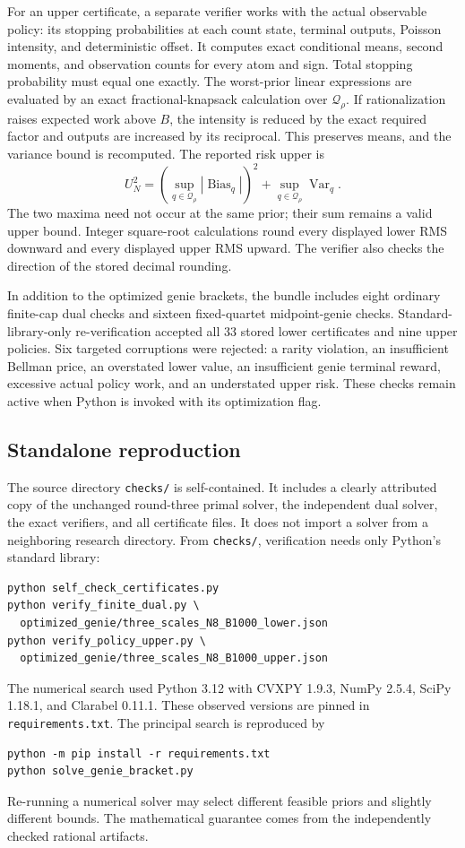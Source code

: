 For an upper certificate, a separate verifier works with the actual
observable policy: its stopping probabilities at each count state,
terminal outputs, Poisson intensity, and deterministic offset. It
computes exact conditional means, second moments, and observation
counts for every atom and sign. Total stopping probability must equal
one exactly. The worst-prior linear expressions are evaluated by an
exact fractional-knapsack calculation over $\mathcal Q_\rho$.
If rationalization raises expected work above $B$, the intensity is
reduced by the exact required factor and outputs are increased by its
reciprocal. This preserves means, and the variance bound is recomputed.
The reported risk upper is
\[
 U_N^2=
 \left(\sup_{q\in\mathcal Q_\rho}
                  |\operatorname{Bias}_q|\right)^2+
 \sup_{q\in\mathcal Q_\rho}\operatorname{Var}_q.
\]
The two maxima need not occur at the same prior; their sum remains a
valid upper bound. Integer square-root calculations round every
displayed lower RMS downward and every displayed upper RMS upward.
The verifier also checks the direction of the stored decimal rounding.

In addition to the optimized genie brackets, the bundle includes eight
ordinary finite-cap dual checks and sixteen fixed-quartet midpoint-genie
checks. Standard-library-only re-verification accepted all 33 stored
lower certificates and nine upper policies. Six targeted corruptions
were rejected: a rarity violation, an insufficient Bellman price, an
overstated lower value, an insufficient genie terminal reward, excessive
actual policy work, and an understated upper risk. These checks remain
active when Python is invoked with its optimization flag.

\subsection{Standalone reproduction}

The source directory \texttt{checks/} is self-contained. It includes
a clearly attributed copy of the unchanged round-three primal solver,
the independent dual solver, the exact verifiers, and all certificate
files. It does not import a solver from a neighboring research directory.
From \texttt{checks/}, verification needs only Python's standard library:
\begin{verbatim}
python self_check_certificates.py
python verify_finite_dual.py \
  optimized_genie/three_scales_N8_B1000_lower.json
python verify_policy_upper.py \
  optimized_genie/three_scales_N8_B1000_upper.json
\end{verbatim}
The numerical search used Python 3.12 with CVXPY 1.9.3, NumPy 2.5.4,
SciPy 1.18.1, and Clarabel 0.11.1. These observed versions are pinned
in \texttt{requirements.txt}. The principal search is reproduced by
\begin{verbatim}
python -m pip install -r requirements.txt
python solve_genie_bracket.py
\end{verbatim}
Re-running a numerical solver may select different feasible priors
and slightly different bounds. The mathematical guarantee comes from
the independently checked rational artifacts.

